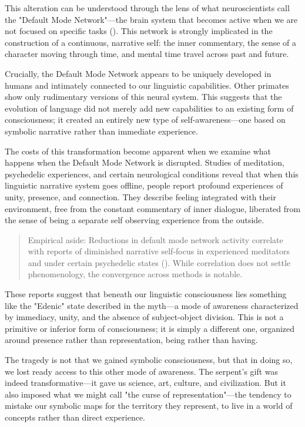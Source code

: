 This alteration can be understood through the lens of what neuroscientists call the "Default Mode Network"—the brain system that becomes active when we are not focused on specific tasks (\parencite{raichle2001default,buckner2008brain}). This network is strongly implicated in the construction of a continuous, narrative self: the inner commentary, the sense of a character moving through time, and mental time travel across past and future.

Crucially, the Default Mode Network appears to be uniquely developed in humans and intimately connected to our linguistic capabilities. Other primates show only rudimentary versions of this neural system. This suggests that the evolution of language did not merely add new capabilities to an existing form of consciousness; it created an entirely new type of self-awareness—one based on symbolic narrative rather than immediate experience.

The costs of this transformation become apparent when we examine what happens when the Default Mode Network is disrupted. Studies of meditation, psychedelic experiences, and certain neurological conditions reveal that when this linguistic narrative system goes offline, people report profound experiences of unity, presence, and connection. They describe feeling integrated with their environment, free from the constant commentary of inner dialogue, liberated from the sense of being a separate self observing experience from the outside.

\begin{quote}\small
Empirical aside: Reductions in default mode network activity correlate with reports of diminished narrative self-focus in experienced meditators and under certain psychedelic states (\parencite{davidson2003alterations,lazar2005meditation,carhart-harris2012neural}). While correlation does not settle phenomenology, the convergence across methods is notable.
\end{quote}

These reports suggest that beneath our linguistic consciousness lies something like the "Edenic" state described in the myth—a mode of awareness characterized by immediacy, unity, and the absence of subject-object division. This is not a primitive or inferior form of consciousness; it is simply a different one, organized around presence rather than representation, being rather than having.

The tragedy is not that we gained symbolic consciousness, but that in doing so, we lost ready access to this other mode of awareness. The serpent's gift was indeed transformative—it gave us science, art, culture, and civilization. But it also imposed what we might call "the curse of representation"—the tendency to mistake our symbolic maps for the territory they represent, to live in a world of concepts rather than direct experience.

